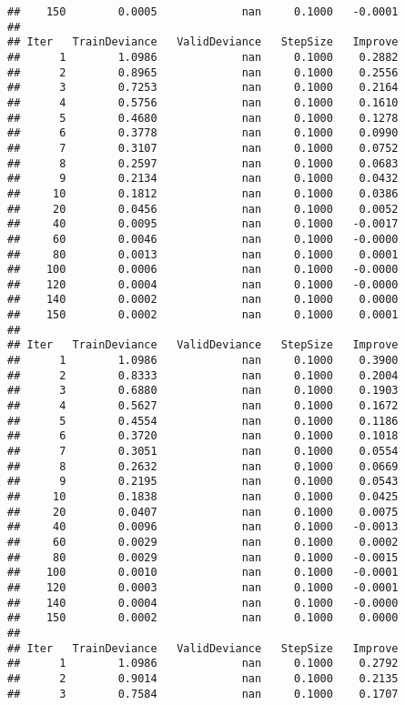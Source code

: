 \documentclass[
]{article}
\begin{document}
\begin{verbatim}
##    150        0.0005             nan     0.1000   -0.0001
## 
## Iter   TrainDeviance   ValidDeviance   StepSize   Improve
##      1        1.0986             nan     0.1000    0.2882
##      2        0.8965             nan     0.1000    0.2556
##      3        0.7253             nan     0.1000    0.2164
##      4        0.5756             nan     0.1000    0.1610
##      5        0.4680             nan     0.1000    0.1278
##      6        0.3778             nan     0.1000    0.0990
##      7        0.3107             nan     0.1000    0.0752
##      8        0.2597             nan     0.1000    0.0683
##      9        0.2134             nan     0.1000    0.0432
##     10        0.1812             nan     0.1000    0.0386
##     20        0.0456             nan     0.1000    0.0052
##     40        0.0095             nan     0.1000   -0.0017
##     60        0.0046             nan     0.1000   -0.0000
##     80        0.0013             nan     0.1000    0.0001
##    100        0.0006             nan     0.1000   -0.0000
##    120        0.0004             nan     0.1000   -0.0000
##    140        0.0002             nan     0.1000    0.0000
##    150        0.0002             nan     0.1000    0.0001
## 
## Iter   TrainDeviance   ValidDeviance   StepSize   Improve
##      1        1.0986             nan     0.1000    0.3900
##      2        0.8333             nan     0.1000    0.2004
##      3        0.6880             nan     0.1000    0.1903
##      4        0.5627             nan     0.1000    0.1672
##      5        0.4554             nan     0.1000    0.1186
##      6        0.3720             nan     0.1000    0.1018
##      7        0.3051             nan     0.1000    0.0554
##      8        0.2632             nan     0.1000    0.0669
##      9        0.2195             nan     0.1000    0.0543
##     10        0.1838             nan     0.1000    0.0425
##     20        0.0407             nan     0.1000    0.0075
##     40        0.0096             nan     0.1000   -0.0013
##     60        0.0029             nan     0.1000    0.0002
##     80        0.0029             nan     0.1000   -0.0015
##    100        0.0010             nan     0.1000   -0.0001
##    120        0.0003             nan     0.1000   -0.0001
##    140        0.0004             nan     0.1000   -0.0000
##    150        0.0002             nan     0.1000    0.0000
## 
## Iter   TrainDeviance   ValidDeviance   StepSize   Improve
##      1        1.0986             nan     0.1000    0.2792
##      2        0.9014             nan     0.1000    0.2135
##      3        0.7584             nan     0.1000    0.1707

\end{verbatim}
\end{document}
